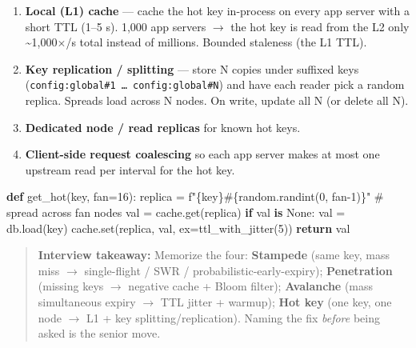 \documentclass[11pt]{article}
\providecommand{\tightlist}{\setlength{\itemsep}{1pt}\setlength{\parskip}{0pt}}
\newenvironment{Shaded}{\begin{snugshade}}{\end{snugshade}}
\newcommand{\BuiltInTok}[1]{\textcolor[rgb]{0.50,0.55,0.55}{#1}}
\newcommand{\CommentTok}[1]{\textcolor[rgb]{0.48,0.49,0.49}{#1}}
\newcommand{\ControlFlowTok}[1]{\textcolor[rgb]{0.99,0.74,0.29}{\textbf{#1}}}
\newcommand{\DecValTok}[1]{\textcolor[rgb]{0.96,0.45,0.00}{#1}}
\newcommand{\KeywordTok}[1]{\textcolor[rgb]{0.81,0.81,0.76}{\textbf{#1}}}
\newcommand{\NormalTok}[1]{\textcolor[rgb]{0.81,0.81,0.76}{#1}}
\newcommand{\OperatorTok}[1]{\textcolor[rgb]{0.81,0.81,0.76}{#1}}
\newcommand{\SpecialCharTok}[1]{\textcolor[rgb]{0.24,0.68,0.91}{#1}}
\newcommand{\SpecialStringTok}[1]{\textcolor[rgb]{0.85,0.27,0.33}{#1}}
\newcommand{\VariableTok}[1]{\textcolor[rgb]{0.15,0.68,0.68}{#1}}
\begin{document}
\begin{enumerate}
\def\labelenumi{\arabic{enumi}.}
\tightlist
\item
  \textbf{Local (L1) cache} --- cache the hot key in-process on every app server with a short TTL (1--5 s). 1,000 app servers \(\rightarrow\) the hot key is read from the L2 only \textasciitilde1,000\(\times\)/s total instead of millions. Bounded staleness (the L1 TTL).
\item
  \textbf{Key replication / splitting} --- store N copies under suffixed keys (\texttt{config:global\#1\ …\ config:global\#N}) and have each reader pick a random replica. Spreads load across N nodes. On write, update all N (or delete all N).
\item
  \textbf{Dedicated node / read replicas} for known hot keys.
\item
  \textbf{Client-side request coalescing} so each app server makes at most one upstream read per interval for the hot key.
\end{enumerate}


\begin{Shaded}
\begin{Highlighting}[]
\KeywordTok{def}\NormalTok{ get\_hot(key, fan}\OperatorTok{=}\DecValTok{16}\NormalTok{):}
\NormalTok{    replica }\OperatorTok{=} \SpecialStringTok{f"}\SpecialCharTok{\{}\NormalTok{key}\SpecialCharTok{\}}\SpecialStringTok{\#}\SpecialCharTok{\{}\NormalTok{random}\SpecialCharTok{.}\NormalTok{randint(}\DecValTok{0}\NormalTok{, fan}\OperatorTok{{-}}\DecValTok{1}\NormalTok{)}\SpecialCharTok{\}}\SpecialStringTok{"}   \CommentTok{\# spread across fan nodes}
\NormalTok{    val }\OperatorTok{=}\NormalTok{ cache.get(replica)}
    \ControlFlowTok{if}\NormalTok{ val }\KeywordTok{is} \VariableTok{None}\NormalTok{:}
\NormalTok{        val }\OperatorTok{=}\NormalTok{ db.load(key)}
\NormalTok{        cache.}\BuiltInTok{set}\NormalTok{(replica, val, ex}\OperatorTok{=}\NormalTok{ttl\_with\_jitter(}\DecValTok{5}\NormalTok{))}
    \ControlFlowTok{return}\NormalTok{ val}
\end{Highlighting}
\end{Shaded}

\begin{quote}
\textbf{Interview takeaway:} Memorize the four: \textbf{Stampede} (same key, mass miss \(\rightarrow\) single-flight / SWR / probabilistic-early-expiry); \textbf{Penetration} (missing keys \(\rightarrow\) negative cache + Bloom filter); \textbf{Avalanche} (mass simultaneous expiry \(\rightarrow\) TTL jitter + warmup); \textbf{Hot key} (one key, one node \(\rightarrow\) L1 + key splitting/replication). Naming the fix \emph{before} being asked is the senior move.
\end{quote}
\end{document}
